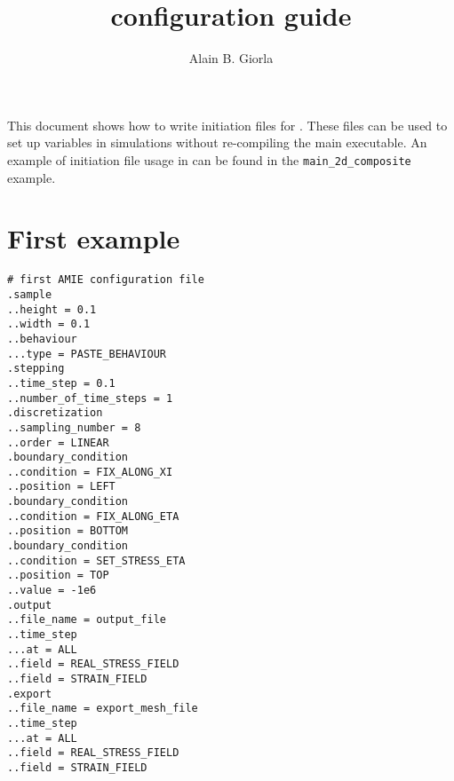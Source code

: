 \documentclass[10pt]{article}
\begin{document}
\title{\amie configuration guide}
\author{Alain B. Giorla}

\maketitle

This document shows how to write initiation files for \amie. These files can be used to set up variables in simulations without re-compiling the main executable. An example of initiation file usage in \amie can be found in the \verb+main_2d_composite+ example.

\tableofcontents

\section{First example}

\verb+# first AMIE configuration file+\\
\verb+.sample+\\
\verb+..height = 0.1+\\
\verb+..width = 0.1+\\
\verb+..behaviour+\\
\verb+...type = PASTE_BEHAVIOUR+\\
\verb+.stepping+\\
\verb+..time_step = 0.1+\\
\verb+..number_of_time_steps = 1+\\
\verb+.discretization+\\
\verb+..sampling_number = 8+\\
\verb+..order = LINEAR+\\
\verb+.boundary_condition+\\
\verb+..condition = FIX_ALONG_XI+\\
\verb+..position = LEFT+\\
\verb+.boundary_condition+\\
\verb+..condition = FIX_ALONG_ETA+\\
\verb+..position = BOTTOM+\\
\verb+.boundary_condition+\\
\verb+..condition = SET_STRESS_ETA+\\
\verb+..position = TOP+\\
\verb+..value = -1e6+\\
\verb+.output+\\
\verb+..file_name = output_file+\\
\verb+..time_step+\\
\verb+...at = ALL+\\
\verb+..field = REAL_STRESS_FIELD+\\
\verb+..field = STRAIN_FIELD+\\
\verb+.export+\\
\verb+..file_name = export_mesh_file+\\
\verb+..time_step+\\
\verb+...at = ALL+\\
\verb+..field = REAL_STRESS_FIELD+\\
\verb+..field = STRAIN_FIELD+\\
\end{document}

